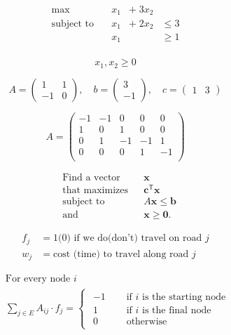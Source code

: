 \documentclass{article}
\begin{document}
\[
\begin{aligned}
    \max& \quad x_1 &+ \;3x_2\\
    \text{subject to}& \quad x_1 & +\; 2x_2 &\le 3 \\
                    & \quad x_1 & &\ge 1 \\
\end{aligned} 
\]

\[x_1,x_2 \ge 0 \]

\[A = 
\begin{pmatrix}
    1 & 1 \\
    -1 & 0
\end{pmatrix}
, \quad b = \begin{pmatrix}
    3 \\ -1
\end{pmatrix}
, \quad c = \begin{pmatrix}
    1 & 3
\end{pmatrix}\]

\[
A = 
\begin{pmatrix}
    -1 & -1 & 0 & 0 & 0 \\
    1 & 0 & 1 & 0 & 0 \\
    0 & 1 & -1 & -1 & 1 \\
    0 & 0 & 0 & 1 & -1 \\
\end{pmatrix}\]


\[
    \begin{aligned}&{\text{Find a vector}}&&\mathbf {x} \\&{\text{that maximizes}}&&\mathbf {c} ^{\mathsf {T}}\mathbf {x} \\&{\text{subject to}}&&A\mathbf {x} \leq \mathbf {b} \\&{\text{and}}&&\mathbf {x} \geq \mathbf {0} .\end{aligned}
\]

\[
\begin{aligned}
    f_j &= 1 \textrm{(0) if we do(don't) travel on road }j \\
    w_j &= \textrm{cost (time) to travel along road }j
\end{aligned}
\]



\[
    \begin{aligned}
        &\textrm{For every node $i$} \\
        &\sum_{j\in E} A_{ij}\cdot f_j = 
            \begin{cases}
                \begin{aligned}
                    -1 \quad & \textrm{ if $i$ is the starting node} \\
                    1 \quad &\textrm{ if $i$ is the final node} \\
                    0 \quad & \textrm{ otherwise}
                \end{aligned}
            \end{cases}
    \end{aligned}
\]
\end{document}
